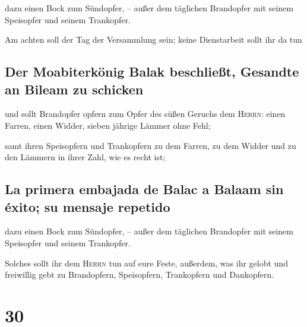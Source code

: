  dazu einen Bock zum Sündopfer, -- außer dem täglichen
Brandopfer mit seinem Speisopfer und seinem Trankopfer.

 Am achten soll der Tag der Versammlung sein; keine
Dienstarbeit sollt ihr da tun

\hypertarget{der-moabiterkuxf6nig-balak-beschlieuxdft-gesandte-an-bileam-zu-schicken}{%
\subsection{Der Moabiterkönig Balak beschließt, Gesandte an Bileam zu
schicken}\label{der-moabiterkuxf6nig-balak-beschlieuxdft-gesandte-an-bileam-zu-schicken}}

 und sollt Brandopfer opfern zum Opfer des süßen Geruchs
dem \textsc{Herrn}: einen Farren, einen Widder, sieben jährige Lämmer
ohne Fehl;

 samt ihren Speisopfern und Trankopfern zu dem Farren, zu
dem Widder und zu den Lämmern in ihrer Zahl, wie es recht ist;

\hypertarget{la-primera-embajada-de-balac-a-balaam-sin-uxe9xito-su-mensaje-repetido}{%
\subsection{La primera embajada de Balac a Balaam sin éxito; su mensaje
repetido}\label{la-primera-embajada-de-balac-a-balaam-sin-uxe9xito-su-mensaje-repetido}}

 dazu einen Bock zum Sündopfer, -- außer dem täglichen
Brandopfer mit seinem Speisopfer und seinem Trankopfer.

 Solches sollt ihr dem \textsc{Herrn} tun auf eure Feste,
außerdem, was ihr gelobt und freiwillig gebt zu Brandopfern,
Speisopfern, Trankopfern und Dankopfern.

\hypertarget{section-29}{%
\section{30}\label{section-29}}

